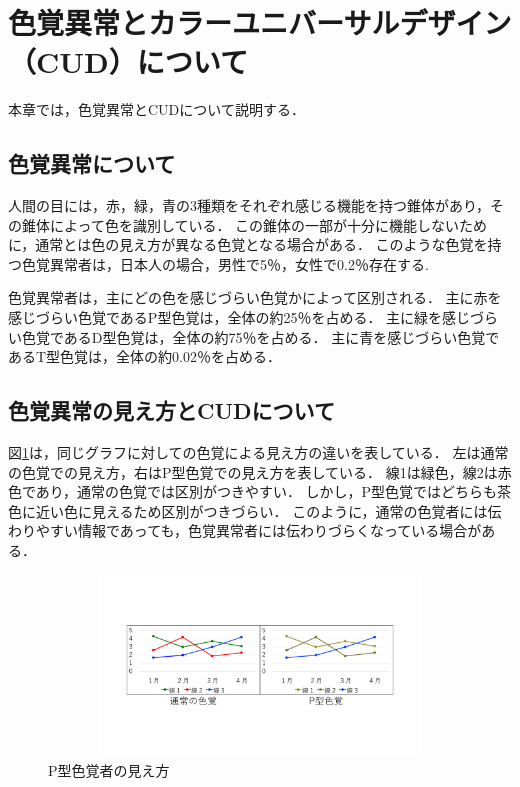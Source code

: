 \section{色覚異常とカラーユニバーサルデザイン（CUD）について}
本章では，色覚異常とCUDについて説明する．

\subsection{色覚異常について}
人間の目には，赤，緑，青の3種類をそれぞれ感じる機能を持つ錐体があり，その錐体によって色を識別している．
この錐体の一部が十分に機能しないために，通常とは色の見え方が異なる色覚となる場合がある．
このような色覚を持つ色覚異常者は，日本人の場合，男性で5％，女性で0.2％存在する.

色覚異常者は，主にどの色を感じづらい色覚かによって区別される．
主に赤を感じづらい色覚であるP型色覚は，全体の約25％を占める．
主に緑を感じづらい色覚であるD型色覚は，全体の約75％を占める．
主に青を感じづらい色覚であるT型色覚は，全体の約0.02％を占める．

\subsection{色覚異常の見え方とCUDについて}
図\ref{fig:pcolor_mae}は，同じグラフに対しての色覚による見え方の違いを表している．
左は通常の色覚での見え方，右はP型色覚での見え方を表している．
線1は緑色，線2は赤色であり，通常の色覚では区別がつきやすい．
しかし，P型色覚ではどちらも茶色に近い色に見えるため区別がつきづらい．
このように，通常の色覚者には伝わりやすい情報であっても，色覚異常者には伝わりづらくなっている場合がある．

\begin{figure}[h]
\begin{center}
 \includegraphics[clip,width=160mm,height=48mm]{images/pcolor_mae.pdf}
\end{center}
 \caption{P型色覚者の見え方}
 \label{fig:pcolor_mae}
\end{figure}

\clearpage

